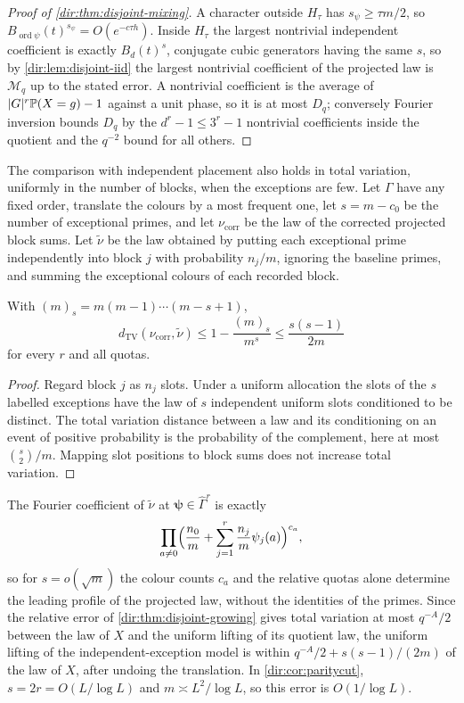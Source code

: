 \begin{proof}[Proof of \cref{dir:thm:disjoint-mixing}]
A character outside $H_\tau$ has $s_\psi\ge\tau m/2$, so $B_{\operatorname{ord}\psi}(t)^{s_\psi}=O(e^{-c\tau h})$.
Inside $H_\tau$ the largest nontrivial independent coefficient is exactly $B_d(t)^s$, conjugate cubic
generators having the same $s$, so by \cref{dir:lem:disjoint-iid} the largest nontrivial coefficient of
the projected law is $\mathcal M_q$ up to the stated error. A nontrivial coefficient is the average of
$\lvert G\rvert^r\mathbb{P}(X=g)-1$ against a unit phase, so it is at most $D_q$; conversely Fourier inversion bounds
$D_q$ by the $d^r-1\le3^r-1$ nontrivial coefficients inside the quotient and the $q^{-2}$ bound for all
others.
\end{proof}

The comparison with independent placement also holds in total variation, uniformly in the number of
blocks, when the exceptions are few. Let $\Gamma$ have any fixed order, translate the colours by a most
frequent one, let $s=m-c_0$ be the number of exceptional primes, and let $\nu_{\mathrm{corr}}$ be the law of
the corrected projected block sums. Let $\widetilde\nu$ be the law obtained by putting each exceptional prime
independently into block $j$ with probability $n_j/m$, ignoring the baseline primes, and summing the
exceptional colours of each recorded block.

\begin{proposition}\label{dir:prop:sparseexc}
With $(m)_s=m(m-1)\cdots(m-s+1)$,
\[
 d_{\mathrm{TV}}(\nu_{\mathrm{corr}},\widetilde\nu)\le1-\frac{(m)_s}{m^s}\le\frac{s(s-1)}{2m}
\]
for every $r$ and all quotas.
\end{proposition}

\begin{proof}
Regard block $j$ as $n_j$ slots. Under a uniform allocation the slots of the $s$ labelled exceptions have the
law of $s$ independent uniform slots conditioned to be distinct. The total variation distance between a law
and its conditioning on an event of positive probability is the probability of the complement, here at most
$\binom s2/m$. Mapping slot positions to block sums does not increase total variation.
\end{proof}

The Fourier coefficient of $\widetilde\nu$ at $\boldsymbol\psi\in\widehat\Gamma^r$ is exactly
\[
 \prod_{a\ne0}\Bigl(\frac{n_0}m+\sum_{j=1}^r\frac{n_j}m\psi_j(a)\Bigr)^{c_a},
\]
so for $s=o(\sqrt m)$ the colour counts $c_a$ and the relative quotas alone determine the leading profile of
the projected law, without the identities of the primes. Since the relative error of
\cref{dir:thm:disjoint-growing} gives total variation at most $q^{-A}/2$ between the law of $X$ and the uniform
lifting of its quotient law, the uniform lifting of the independent-exception model is within
$q^{-A}/2+s(s-1)/(2m)$ of the law of $X$, after undoing the translation. In \cref{dir:cor:paritycut},
$s=2r=O(L/\log L)$ and $m\asymp L^2/\log L$, so this error is $O(1/\log L)$.

